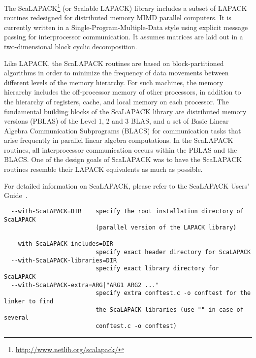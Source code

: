 \subsubsection{\scalapack}

The ScaLAPACK\footnote{\url{http://www.netlib.org/scalapack/}} (or
Scalable LAPACK) library includes a subset of LAPACK routines
redesigned for distributed memory MIMD parallel computers. It is
currently written in a Single-Program-Multiple-Data style using
explicit message passing for interprocessor communication. It assumes
matrices are laid out in a two-dimensional block cyclic decomposition.

Like LAPACK, the ScaLAPACK routines are based on block-partitioned
algorithms in order to minimize the frequency of data movements
between different levels of the memory hierarchy. For such machines,
the memory hierarchy includes the off-processor memory of other
processors, in addition to the hierarchy of registers, cache, and
local memory on each processor.  The fundamental building blocks of
the ScaLAPACK library are distributed memory versions (PBLAS) of the
Level 1, 2 and 3 BLAS, and a set of Basic Linear Algebra Communication
Subprograms (BLACS) for communication tasks that arise frequently in
parallel linear algebra computations. In the ScaLAPACK routines, all
interprocessor communication occurs within the PBLAS and the BLACS.
One of the design goals of ScaLAPACK was to have the ScaLAPACK
routines resemble their LAPACK equivalents as much as possible.

For detailed information on ScaLAPACK, please refer to the ScaLAPACK
Users' Guide~\cite{BCC+97}.


{\footnotesize
\begin{verbatim}
  --with-ScaLAPACK=DIR    specify the root installation directory of ScaLAPACK
                          (parallel version of the LAPACK library)

  --with-ScaLAPACK-includes=DIR
                          specify exact header directory for ScaLAPACK
  --with-ScaLAPACK-libraries=DIR
                          specify exact library directory for ScaLAPACK
  --with-ScaLAPACK-extra=ARG|"ARG1 ARG2 ..."
                          specify extra conftest.c -o conftest for the linker to find 
                          the ScaLAPACK libraries (use "" in case of several 
                          conftest.c -o conftest)
\end{verbatim}
}

